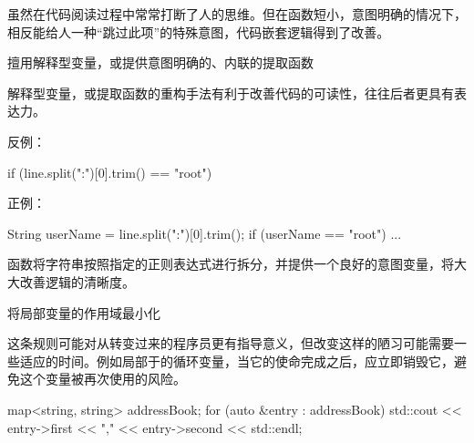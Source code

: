 \begin{content}
虽然在代码阅读过程中常常打断了人的思维。但在函数短小，意图明确的情况下，相反能给人一种“跳过此项”的特殊意图，代码嵌套逻辑得到了改善。

\begin{regulation}
擅用解释型变量，或提供意图明确的、内联的提取函数
\end{regulation}

解释型变量，或提取函数的重构手法有利于改善代码的可读性，往往后者更具有表达力。

反例：
\begin{leftbar}
\begin{c++}
if (line.split(":")[0].trim() == "root")
\end{c++}
\end{leftbar}

正例：
\begin{leftbar}
\begin{c++}
String userName = line.split(":")[0].trim();
if (userName == "root")
{
    ...
}
\end{c++}
\end{leftbar}

函数将字符串按照指定的正则表达式进行拆分，并提供一个良好的意图变量，将大大改善逻辑的清晰度。

\begin{regulation}
将局部变量的作用域最小化
\end{regulation}

这条规则可能对从\clang{}转变过来的\cpp{}程序员更有指导意义，但改变这样的陋习可能需要一些适应的时间。例如局部于的循环变量，当它的使命完成之后，应立即销毁它，避免这个变量被再次使用的风险。

\begin{leftbar}
\begin{c++}
map<string, string> addressBook;
for (auto &entry : addressBook) 
{ 
    std::cout << entry->first << "," << entry->second << std::endl;
}
\end{c++}
\end{leftbar}

\end{content}
